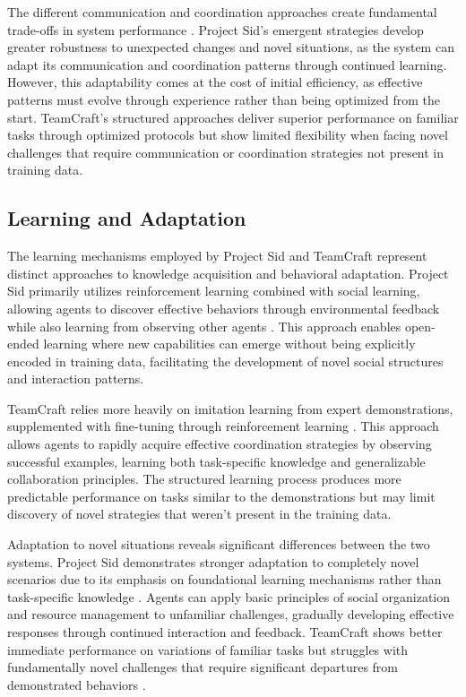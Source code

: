 \documentclass[a4paper, 12pt]{article}
\begin{document}
The different communication and coordination approaches create fundamental trade-offs in system performance \autocite{al2024projectsidmanyagentsimulations,long2024teamcraftbenchmarkmultimodalmultiagent,qiu2024collaborativeintelligencepropagatingintentions,dong2024villageragentgraphbasedmultiagentframework}. Project Sid's emergent strategies develop greater robustness to unexpected changes and novel situations, as the system can adapt its communication and coordination patterns through continued learning. However, this adaptability comes at the cost of initial efficiency, as effective patterns must evolve through experience rather than being optimized from the start. TeamCraft's structured approaches deliver superior performance on familiar tasks through optimized protocols but show limited flexibility when facing novel challenges that require communication or coordination strategies not present in training data.

\subsection{Learning and Adaptation}

The learning mechanisms employed by Project Sid and TeamCraft represent distinct approaches to knowledge acquisition and behavioral adaptation. Project Sid primarily utilizes reinforcement learning combined with social learning, allowing agents to discover effective behaviors through environmental feedback while also learning from observing other agents \autocite{al2024projectsidmanyagentsimulations}. This approach enables open-ended learning where new capabilities can emerge without being explicitly encoded in training data, facilitating the development of novel social structures and interaction patterns.

TeamCraft relies more heavily on imitation learning from expert demonstrations, supplemented with fine-tuning through reinforcement learning \autocite{long2024teamcraftbenchmarkmultimodalmultiagent,zhao2024steveseriesstepbystepconstruction}. This approach allows agents to rapidly acquire effective coordination strategies by observing successful examples, learning both task-specific knowledge and generalizable collaboration principles. The structured learning process produces more predictable performance on tasks similar to the demonstrations but may limit discovery of novel strategies that weren't present in the training data.

Adaptation to novel situations reveals significant differences between the two systems. Project Sid demonstrates stronger adaptation to completely novel scenarios due to its emphasis on foundational learning mechanisms rather than task-specific knowledge \autocite{al2024projectsidmanyagentsimulations}. Agents can apply basic principles of social organization and resource management to unfamiliar challenges, gradually developing effective responses through continued interaction and feedback. TeamCraft shows better immediate performance on variations of familiar tasks but struggles with fundamentally novel challenges that require significant departures from demonstrated behaviors \autocite{long2024teamcraftbenchmarkmultimodalmultiagent}.
\end{document}

